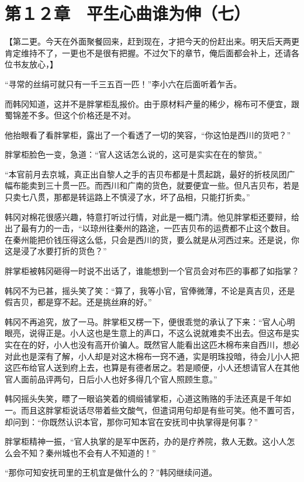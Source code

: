 \section{第１２章　平生心曲谁为伸（七）}

【第二更。今天在外面聚餐回来，赶到现在，才把今天的份赶出来。明天后天两更肯定维持不了，一更也不是很有把握。不过欠下的章节，俺后面都会补上，还请各位书友放心，】

“寻常的丝绢可就只有一千三五百一匹！”李小六在后面听着乍舌。

而韩冈知道，这并不是胖掌柜乱报价。由于原材料产量的稀少，棉布可不便宜，跟蜀锦差不多。但这个价格还是不对。

他抬眼看了看胖掌柜，露出了一个看透了一切的笑容，“你这怕是西川的货吧？”

胖掌柜脸色一变，急道：“官人这话怎么说的，这可是实实在在的黎货。”

“本官前月去京城，真正出自黎人之手的吉贝布都是十贯起跳，最好的折枝凤团广幅布能卖到三十贯一匹。而西川和广南的货色，就要便宜一些。但凡吉贝布，若是只卖七八贯，那都是转运路上不慎浸了水，坏了品相，只能打折卖。”

韩冈对棉花很感兴趣，特意打听过行情，对此是一概门清。他见胖掌柜还要辩，给出了最有力的一击，“以琼州往秦州的路途，一匹吉贝布的运费都不止这个数目。在秦州能把价钱压得这么低，只会是西川的货，要么就是从河西过来。还是说，你这是浸了水要打折的货色？”

胖掌柜被韩冈砸得一时说不出话了，谁能想到一个官员会对布匹的事都了如指掌？

韩冈不为已甚，摇头笑了笑：“算了，我等小官，官俸微薄，不论是真吉贝，还是假吉贝，都是穿不起。还是挑丝麻的好。”

韩冈不再追究，放了一马。胖掌柜又楞一下，便很乖觉的承认了下来：“官人心明眼亮，说得正是。小人这也是生意上的声口，不这么说就难卖不出去。但这布是实实在在的好，小人也没有高开价骗人。既然官人能看出这匹木棉布来自西川，想必对此也是深有了解，小人却是对这木棉布一窍不通，实是明珠投暗，待会儿小人把这匹布给官人送到府上去，也算是有德者居之。若是顺便，小人还想请官人在其他官人面前品评两句，日后小人也好多得几个官人照顾生意。”

韩冈摇头失笑，瞟了一眼谄笑着的绸缎铺掌柜，心道这贿赂的手法还真是千年如一。而且这胖掌柜说话尽带着些文酸气，但遣词用句却是有些可笑。他不置可否，却问到：“你既然认识本官，那你可知本官在安抚司中执掌得是何事？”

胖掌柜精神一振，“官人执掌的是军中医药，办的是疗养院，救人无数。这小人怎么会不知？秦州城也不会有人不知道的！”

“那你可知安抚司里的王机宜是做什么的？”韩冈继续问道。

